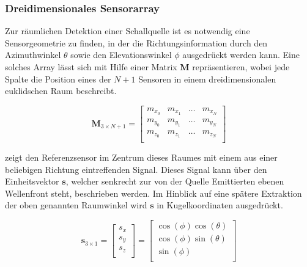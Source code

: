 \subsubsection{Dreidimensionales Sensorarray}
\label{subsubsec:3DArray}
Zur räumlichen Detektion einer Schallquelle ist es notwendig eine Sensorgeometrie zu finden, in der die Richtungsinformation durch den Azimuthwinkel $\theta$ sowie den Elevationswinkel $\phi$ ausgedrückt werden kann. Eine solches Array lässt sich mit Hilfe einer Matrix $\mathbf{M}$ repräsentieren, wobei jede Spalte die Position eines der $N+1$ Sensoren in einem dreidimensionalen euklidschen Raum beschreibt. 

\begin{equation}
    \mathbf{M}_{3 \times N+1} = 
    \begin{bmatrix}
        m_{x_0} & m_{x_1} & \dots & m_{x_N} \\
        m_{y_0} & m_{y_1} & \dots & m_{y_N} \\
        m_{z_0} & m_{z_1} & \dots & m_{z_N} \\
    \end{bmatrix}
\end{equation}



 zeigt den Referenzsensor im Zentrum dieses Raumes mit einem aus einer beliebigen Richtung eintreffenden Signal. Dieses Signal kann über den Einheitsvektor $\mathbf{s}$, welcher senkrecht zur von der Quelle Emittierten ebenen Wellenfront steht, beschrieben werden. Im Hinblick auf eine spätere Extraktion der oben genannten Raumwinkel wird $\mathbf{s}$ in Kugelkoordinaten ausgedrückt.

\begin{equation}
\textbf{s}_{3 \times 1} =
\begin{bmatrix}
        s_x \\
        s_y \\
        s_z\\
    \end{bmatrix}
    =
    \begin{bmatrix}
        \cos{(\phi)} \cos{(\theta)} \\
        \cos{(\phi)} \sin{(\theta)} \\
        \sin{(\phi)}\\
    \end{bmatrix}
\end{equation}

